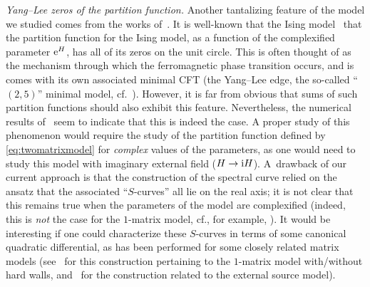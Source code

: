 \documentclass[10pt,a4paper]{amsart}
\numberwithin{equation}{section}
\begin{document}
\textit{Yang--Lee zeros of the partition function.} Another tantalizing feature of the model we studied comes from the works of~\cite{AAM1,AAM2, Staudacher}. It is well-known that the Ising model~\cite{YangLee2, YangLee1} that the partition function for the
Ising model, as a function of the complexified parameter ${\rm e}^H$, has all of its zeros on the unit circle. This is often thought of as
the mechanism through which the ferromagnetic phase transition occurs, and is comes with its own associated minimal CFT
(the Yang--Lee edge, the so-called ``$(2,5)$'' minimal model, cf.~\cite{Cardy}). However, it is far from obvious that sums of
such partition functions should also exhibit this feature. Nevertheless, the numerical results of~\cite{AAM1,AAM2,AAD, Staudacher}
seem to indicate that this is indeed the case. A proper study of this phenomenon would require the study of the partition
function defined by \eqref{eq:twomatrixmodel} for \textit{complex} values of the parameters, as one would need to study this model
with imaginary external field ($H\to {\rm i}H$). A~drawback of our current approach is that the construction of the spectral curve
relied on the ansatz that the associated ``$S$-curves'' all lie on the real axis; it is not clear that this remains true when
the parameters of the model are complexified (indeed, this is \textit{not} the case for the $1$-matrix model, cf., for example, \cite{Bertola-Tovbis,BGM}). It would be interesting if one could characterize these $S$-curves in terms of some
canonical quadratic differential, as has been performed for some closely related matrix models (see~\cite{KS, Rakhmanov} for
this construction pertaining to the $1$-matrix model with/without hard walls, and~\cite{MFS1,MFS2,MFS3} for the construction
related to the external source model).

\appendix
\end{document}
